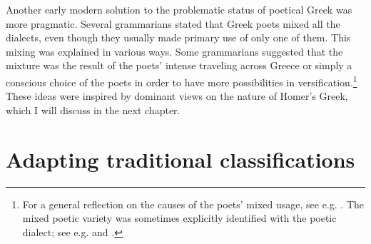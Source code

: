 {Another early modern solution to the problematic status of poetical Greek was more pragmatic. Several grammarians stated that Greek poets mixed all the dialects, even though they usually made primary use of only one of them. This mixing was explained in various ways. Some grammarians suggested that the mixture was the result of the poets’ intense traveling across Greece or simply a conscious choice of the poets in order to have more possibilities in versification.\footnote{For a general reflection on the causes of the poets’ mixed usage, see e.g. \citet[*.3\textsc{\textsuperscript{r}}–*.4\textsc{\textsuperscript{r}}]{Gottleber1765}. The mixed poetic variety was sometimes explicitly identified with the poetic dialect; see e.g. \citet[111]{Bayly1756} and \citet[198]{Peternader1776}.} These ideas were inspired by dominant views on the nature of Homer’s Greek, which I will discuss in the next chapter.

\section{Adapting traditional classifications}\label{sec:2.8}

}
